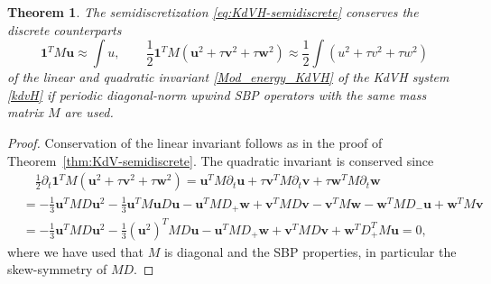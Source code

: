 \documentclass{article}
\newtheorem{thm}{Theorem}
\begin{document}
\begin{thm}
\label{thm:KdVH-semidiscrete}
    The semidiscretization \eqref{eq:KdVH-semidiscrete} conserves the discrete
    counterparts
    \begin{equation}
        \pmb{1}^T M \pmb{u} \approx \int u,
        \qquad
        \frac{1}{2} \pmb{1}^T M \left( \pmb{u}^2 + \tau \pmb{v}^2 + \tau \pmb{w}^2 \right) \approx \frac{1}{2} \int \left( u^2 + \tau v^2 + \tau w^2 \right)
    \end{equation}
    of the linear and quadratic invariant \eqref{Mod_energy_KdVH} of the KdVH
    system \eqref{kdvH} if periodic diagonal-norm upwind SBP operators with the
    same mass matrix $M$ are used.
\end{thm}
\begin{proof}
    Conservation of the linear invariant follows as in the proof of
    Theorem~\ref{thm:KdV-semidiscrete}. The quadratic invariant is conserved
    since
    \begin{equation}
    \begin{aligned}
        &\quad
        \frac{1}{2} \partial_t \pmb{1}^T M \left( \pmb{u}^2 + \tau \pmb{v}^2 + \tau \pmb{w}^2 \right)
        =
        \pmb{u}^T M \partial_t \pmb{u}
        + \tau \pmb{v}^T M \partial_t \pmb{v}
        + \tau \pmb{w}^T M \partial_t \pmb{w}
        \\
        &=
        - \frac{1}{3} \pmb{u}^T M D \pmb{u}^2
        - \frac{1}{3} \pmb{u}^T M \pmb{u} D \pmb{u}
        - \pmb{u}^T M D_+ \pmb{w}
        + \pmb{v}^T M D \pmb{v}
        - \pmb{v}^T M \pmb{w}
        - \pmb{w}^T M D_- \pmb{u}
        + \pmb{w}^T M \pmb{v}
        \\
        &=
        - \frac{1}{3} \pmb{u}^T M D \pmb{u}^2
        - \frac{1}{3} (\pmb{u}^2)^T M D \pmb{u}
        - \pmb{u}^T M D_+ \pmb{w}
        + \pmb{v}^T M D \pmb{v}
        + \pmb{w}^T D_+^T M \pmb{u}
        =
        0,
    \end{aligned}
    \end{equation}
    where we have used that $M$ is diagonal and the SBP properties,
    in particular the skew-symmetry of $M D$.
\end{proof}
\end{document}
